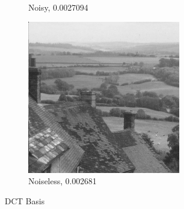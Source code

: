 \documentclass[a4paper]{article}
\begin{document}
\begin{figure}[H]
\begin{subfigure}{0.24\linewidth}
        \caption{Noisy, 0.0027094}
    \end{subfigure}
    \begin{subfigure}{0.24\linewidth}
        \centering
        \includegraphics[width = \linewidth]{dct2D/goldhill reconstructed using all measurements, without noise.png}
        \caption{Noiseless, 0.002681}
    \end{subfigure}
    \caption{DCT Basis}
    \label{fig:dcta}
\end{figure}
\end{document}
